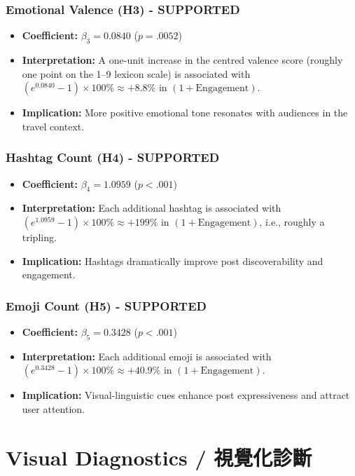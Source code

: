 \documentclass[12pt,a4paper,fontset=none]{ctexart}
\begin{document}
\subsubsection{Emotional Valence (H3) - SUPPORTED}
\begin{itemize}
    \item \textbf{Coefficient:} $\beta_3 = 0.0840$ ($p = .0052$)
    \item \textbf{Interpretation:} A one-unit increase in the centred valence score (roughly one point on the 1--9 lexicon scale) is associated with $(e^{0.0840}-1)\times 100\% \approx +8.8\%$ in $(1+\text{Engagement})$.
    \item \textbf{Implication:} More positive emotional tone resonates with audiences in the travel context.
\end{itemize}

\subsubsection{Hashtag Count (H4) - SUPPORTED}
\begin{itemize}
    \item \textbf{Coefficient:} $\beta_4 = 1.0959$ ($p < .001$)
    \item \textbf{Interpretation:} Each additional hashtag is associated with $(e^{1.0959}-1)\times 100\% \approx +199\%$ in $(1+\text{Engagement})$, i.e., roughly a tripling.
    \item \textbf{Implication:} Hashtags dramatically improve post discoverability and engagement.
\end{itemize}

\subsubsection{Emoji Count (H5) - SUPPORTED}
\begin{itemize}
    \item \textbf{Coefficient:} $\beta_5 = 0.3428$ ($p < .001$)
    \item \textbf{Interpretation:} Each additional emoji is associated with $(e^{0.3428}-1)\times 100\% \approx +40.9\%$ in $(1+\text{Engagement})$.
    \item \textbf{Implication:} Visual-linguistic cues enhance post expressiveness and attract user attention.
\end{itemize}

\newpage

\section{Visual Diagnostics / 視覺化診斷}
\end{document}
